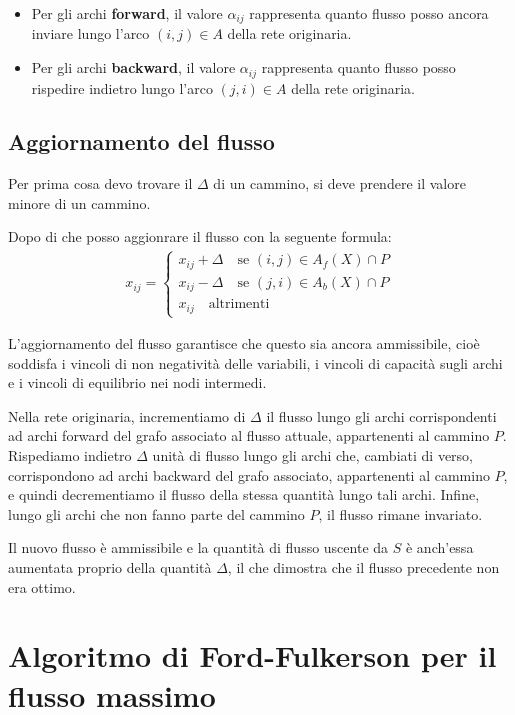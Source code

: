 \begin{itemize}
  \item Per gli archi \textbf{forward}, il valore $\alpha_{ij}$ rappresenta quanto flusso posso ancora inviare lungo l'arco $(i, j) \in A$ della rete originaria.
  \item Per gli archi \textbf{backward}, il valore $\alpha_{ij}$ rappresenta quanto flusso posso rispedire indietro lungo l'arco $(j, i) \in A$ della rete originaria.
\end{itemize}


\subsection{Aggiornamento del flusso}
Per prima cosa devo trovare il $\Delta$ di un cammino, si deve prendere il valore minore di un cammino.

Dopo di che posso aggionrare il flusso con la seguente formula:
\begin{align}
  x_{ij} = 
  \begin{cases}
    x_{ij} + \Delta  \quad \text{se } (i, j) \in A_f(X) \cap P \\
    x_{ij} - \Delta  \quad \text{se } (j, i) \in A_b(X) \cap P \\
    x_{ij} \quad \text{altrimenti}
  \end{cases}
\end{align}


L'aggiornamento del flusso garantisce che questo sia ancora ammissibile, cioè soddisfa i vincoli di non negatività delle variabili, i vincoli di capacità sugli archi e i vincoli di equilibrio nei nodi intermedi.

Nella rete originaria, incrementiamo di $\Delta$ il flusso lungo gli archi corrispondenti ad archi forward del grafo associato al flusso attuale, appartenenti al cammino $P$. Rispediamo indietro $\Delta$ unità di flusso lungo gli archi che, cambiati di verso, corrispondono ad archi backward del grafo associato, appartenenti al cammino $P$, e quindi decrementiamo il flusso della stessa quantità lungo tali archi. Infine, lungo gli archi che non fanno parte del cammino $P$, il flusso rimane invariato.

Il nuovo flusso è ammissibile e la quantità di flusso uscente da $S$ è anch'essa aumentata proprio della quantità $\Delta$, il che dimostra che il flusso precedente non era ottimo.


\section{Algoritmo di Ford-Fulkerson per il flusso massimo}

